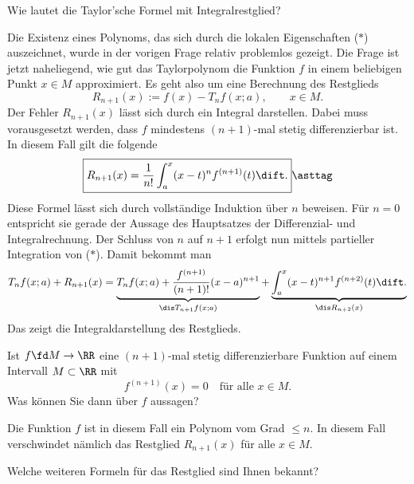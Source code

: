 \begin{frage}\label{q:taylor-formel-mit-integralrestglied}
  Wie lautet die Taylor'sche Formel mit Integralrestglied?
\end{frage}

\begin{antwort}
  Die Existenz eines Polynoms, 
  das sich durch die lokalen Eigenschaften 
  ($\ast$) auszeichnet, wurde in der vorigen Frage 
  relativ problemlos gezeigt. 
  Die Frage ist jetzt naheliegend, wie gut das Taylorpolynom 
  die Funktion $f$ in einem beliebigen Punkt $x\in M$ approximiert. 
  Es geht also um eine Berechnung des Restglieds 
  \[
  R_{n+1}(x) :=  f(x) - T_n f(x;a), \qquad x\in M.
  \]
  Der Fehler $R_{n+1}(x)$ lässt sich durch ein 
  Integral darstellen. Dabei muss vorausgesetzt werden, 
  dass $f$ mindestens $(n+1)$-mal stetig differenzierbar ist. 
  In diesem Fall gilt die 
  folgende 
  \begin{equation}
    \boxed{
      R_{n+1} (x) = \frac{1}{n!} \int_a^x (x-t)^n f^{(n+1)} (t) \dift.}
    \asttag
  \end{equation}
  Diese Formel lässt sich durch vollständige Induktion über $n$ beweisen. 
  Für $n=0$ entspricht sie gerade der Aussage des Hauptsatzes 
  der Differenzial- und Integralrechnung. Der Schluss 
  von $n$ auf $n+1$ erfolgt nun mittels partieller Integration von 
  ($\ast$). Damit bekommt man  
  \[
  T_n f(x;a)+R_{n+1}(x)=
  \underbrace{T_n f(x;a)+\frac{f^{(n+1)}}{(n+1)!} 
    (x-a)^{n+1}}_{\dis T_{n+1} f (x;a)} 
  + 
  \underbrace{\int_a^x (x-t)^{n+1} f^{(n+2)} (t) \dift.}_{ \dis R_{n+2}(x)}
  \]
  Das zeigt die Integraldarstellung des Restglieds. 
  \AntEnd
\end{antwort}

\begin{frage}
  Ist $f\fd M\to \RR$ eine $(n+1)$-mal stetig differenzierbare Funktion 
  auf einem Intervall $M\subset\RR$ 
  mit 
  \[
  f^{(n+1)}( x )= 0 \quad\text{für alle $x\in M$}.
  \]
  Was können Sie dann über $f$ aussagen?
\end{frage}

\begin{antwort}
  Die Funktion $f$ ist in diesem Fall ein Polynom vom Grad $\le n$. 
  In diesem Fall verschwindet nämlich das Restglied 
  $R_{n+1}(x)$ für alle $x\in M$. 
  \AntEnd
\end{antwort}

\begin{frage}
  Welche weiteren Formeln für das Restglied sind Ihnen bekannt?
\end{frage}

